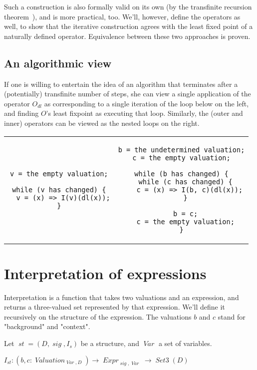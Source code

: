 \documentclass[oneside,12pt]{book}
\theoremstyle{definition}
\theoremstyle{remark}
\newcommand\var[1]{\mathop{\mathit{#1}}\nolimits}
\newcommand{\sig}{\var{sig}}
\newcommand{\st}{\var{st}}
\newcommand{\Var}{\var{Var}}
\newcommand{\SetIII}{\var{Set3}}
\newcommand{\Valuation}{\var{Valuation}}
\newcommand{\Expr}{\var{Expr}}
\newcommand{\dl}{\var{dl}}
\begin{document}
Such a construction is also formally valid on its own (by the transfinite recursion
theorem~\cite{Rin2014TransfiniteRA}), and is more practical, too. We'll,
however, define the operators as well, to show that the iterative construction
agrees with the least fixed point of a naturally defined operator.
Equivalence between these two approaches is proven.

\subsection{An algorithmic view}

If one is willing to entertain the idea of an algorithm that terminates
after a (potentially) transfinite number of steps, she can view a single application
of the operator $O_{\dl}$ as corresponding to a single iteration of the loop below
on the left, and finding $O$'s least fixpoint as executing that loop.
Similarly, the (outer and inner) operators can be viewed as the nested loops on the right.
%
\begin{center}
\begin{tabular}{c|c}
\begin{lstlisting}[basicstyle=\footnotesize]
v = the empty valuation;

while (v has changed) {
  v = (x) => I(v)(dl(x));
}
\end{lstlisting} &
\begin{lstlisting}[basicstyle=\footnotesize]
b = the undetermined valuation;
c = the empty valuation;

while (b has changed) {
  while (c has changed) {
    c = (x) => I(b, c)(dl(x));
  }
  
  b = c;
  c = the empty valuation;
}
\end{lstlisting}
\end{tabular}
\end{center}


\section{Interpretation of expressions}
Interpretation is a function that takes two valuations and an expression, and
returns a three-valued set represented by that expression. We'll define it
recursively on the structure of the expression. The valuations $b$ and $c$ stand
for "background" and "context".

\begin{defBox}
  Let $\st = (D, \sig, I_s)$ be a structure, and $\Var$ a set of variables.
  
  \bigskip \noindent
  $I_{\st}\colon (b, c \colon \Valuation_{\Var,D}) \to \Expr_{\sig,\Var} \to \SetIII(D)$
\end{defBox}
\end{document}
